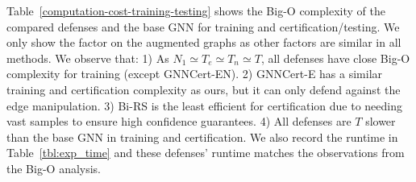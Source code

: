 Table~\ref{computation-cost-training-testing} shows the Big-O complexity of the compared defenses and the base GNN for training and certification/testing. We only show the factor on the augmented graphs as other factors are similar in all methods.   
We observe that: 1) {As $N_1 \simeq T_e \simeq T_n \simeq T$,  all defenses have close Big-O complexity for training (except GNNCert-EN)}. 
2) GNNCert-E has a similar training and certification complexity as ours, but it can only defend against the edge manipulation. 3) Bi-RS is the least efficient for certification due to needing vast samples to ensure high confidence guarantees. 
{4) All defenses are $T$ slower than the base GNN in training and certification.}
{We also record the runtime in Table~\ref{tbl:exp_time} and these defenses' runtime matches the observations from the Big-O analysis.} 








